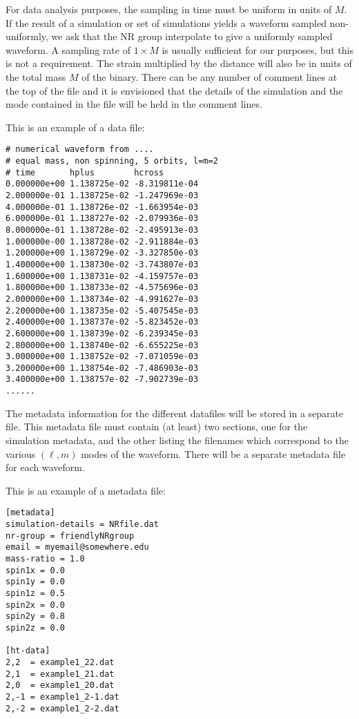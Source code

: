 \documentclass[10pt]{ligodcc}
\begin{document}
For data analysis purposes, the sampling in time must be uniform in
units of $M$.  If the result of a simulation or set of simulations
yields a waveform sampled non-uniformly, we ask that the NR group
interpolate to give a uniformly sampled waveform.  A sampling rate of
$1\times M$ is usually sufficient for our purposes, but this is not a
requirement.  The strain multiplied by the distance will also be in
units of the total mass $M$ of the binary.  There can be any number of
comment lines at the top of the file and it is envisioned that the
details of the simulation and the mode contained in the file will be
held in the comment lines.

This is an example of a data file:

\begin{verbatim}
# numerical waveform from ....
# equal mass, non spinning, 5 orbits, l=m=2
# time       hplus        hcross
0.000000e+00 1.138725e-02 -8.319811e-04
2.000000e-01 1.138725e-02 -1.247969e-03
4.000000e-01 1.138726e-02 -1.663954e-03
6.000000e-01 1.138727e-02 -2.079936e-03
8.000000e-01 1.138728e-02 -2.495913e-03
1.000000e-00 1.138728e-02 -2.911884e-03
1.200000e+00 1.138729e-02 -3.327850e-03
1.400000e+00 1.138730e-02 -3.743807e-03
1.600000e+00 1.138731e-02 -4.159757e-03
1.800000e+00 1.138733e-02 -4.575696e-03
2.000000e+00 1.138734e-02 -4.991627e-03
2.200000e+00 1.138735e-02 -5.407545e-03
2.400000e+00 1.138737e-02 -5.823452e-03
2.600000e+00 1.138739e-02 -6.239345e-03
2.800000e+00 1.138740e-02 -6.655225e-03
3.000000e+00 1.138752e-02 -7.071059e-03
3.200000e+00 1.138754e-02 -7.486903e-03
3.400000e+00 1.138757e-02 -7.902739e-03
......
\end{verbatim}

The metadata information for the different datafiles will be stored in a
separate file.  This metadata file must contain (at least) two sections,
one for the simulation metadata, and the other listing the filenames
which correspond to the various $(\ell,m)$ modes of the waveform.  There
will be a separate metadata file for each waveform.

This is an example of a metadata file:

\begin{verbatim}
[metadata]
simulation-details = NRfile.dat
nr-group = friendlyNRgroup
email = myemail@somewhere.edu
mass-ratio = 1.0
spin1x = 0.0
spin1y = 0.0
spin1z = 0.5
spin2x = 0.0
spin2y = 0.8
spin2z = 0.0

[ht-data]
2,2  = example1_22.dat
2,1  = example1_21.dat
2,0  = example1_20.dat
2,-1 = example1_2-1.dat
2,-2 = example1_2-2.dat
\end{verbatim}
\end{document}
